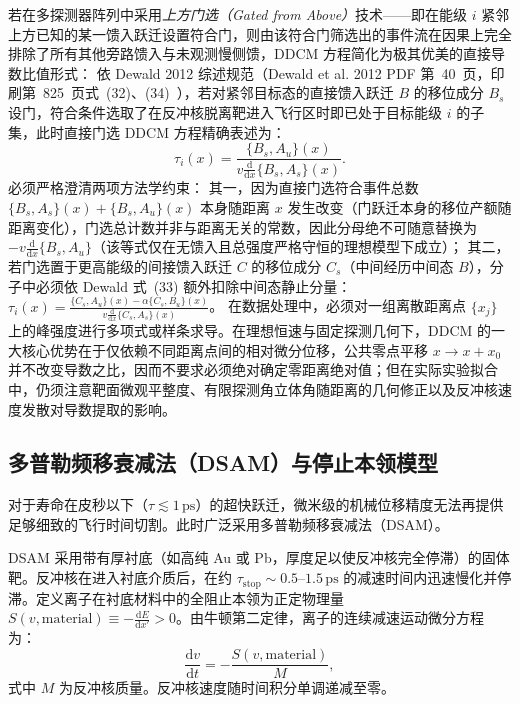 若在多探测器阵列中采用\emph{上方门选（Gated from Above）}技术——即在能级 $i$ 紧邻上方已知的某一馈入跃迁设置符合门，则由该符合门筛选出的事件流在因果上完全排除了所有其他旁路馈入与未观测慢侧馈，DDCM 方程简化为极其优美的直接导数比值形式：
依 Dewald 2012 综述规范（Dewald et al. 2012 PDF 第~40~页，印刷第~825~页式~(32)、(34)~\cite{dewald-2012-ddcm-recoil-distance}），若对紧邻目标态的直接馈入跃迁 $B$ 的移位成分 $B_s$ 设门，符合条件选取了在反冲核脱离靶进入飞行区时即已处于目标能级 $i$ 的子集，此时直接门选 DDCM 方程精确表述为：
\begin{equation}\label{eq:5-8-ddcm-gated}
\tau_i(x) = \frac{\{B_s, A_u\}(x)}{v \frac{\mathrm{d}}{\mathrm{d}x} \{B_s, A_s\}(x)}.
\end{equation}
必须严格澄清两项方法学约束：
其一，因为直接门选符合事件总数 $\{B_s, A_s\}(x) + \{B_s, A_u\}(x)$ 本身随距离 $x$ 发生改变（门跃迁本身的移位产额随距离变化），门选总计数并非与距离无关的常数，因此分母绝不可随意替换为 $-v \frac{\mathrm{d}}{\mathrm{d}x} \{B_s, A_u\}$（该等式仅在无馈入且总强度严格守恒的理想模型下成立）；
其二，若门选置于更高能级的间接馈入跃迁 $C$ 的移位成分 $C_s$（中间经历中间态 $B$），分子中必须依 Dewald 式~(33) 额外扣除中间态静止分量：$\tau_i(x) = \frac{\{C_s, A_u\}(x) - \alpha \{C_s, B_u\}(x)}{v \frac{\mathrm{d}}{\mathrm{d}x} \{C_s, A_s\}(x)}$。
在数据处理中，必须对一组离散距离点 $\{x_j\}$ 上的峰强度进行多项式或样条求导。在理想恒速与固定探测几何下，DDCM 的一大核心优势在于仅依赖不同距离点间的相对微分位移，公共零点平移 $x \to x + x_0$ 并不改变导数之比，因而不要求必须绝对确定零距离绝对值；但在实际实验拟合中，仍须注意靶面微观平整度、有限探测角立体角随距离的几何修正以及反冲核速度发散对导数提取的影响。

\subsection{多普勒频移衰减法（DSAM）与停止本领模型}\label{subsec:5-8-3}

对于寿命在皮秒以下（$\tau \lesssim 1\,\text{ps}$）的超快跃迁，微米级的机械位移精度无法再提供足够细致的飞行时间切割。此时广泛采用多普勒频移衰减法（DSAM）。

DSAM 采用带有厚衬底（如高纯 Au 或 Pb，厚度足以使反冲核完全停滞）的固体靶。反冲核在进入衬底介质后，在约 $\tau_{\mathrm{stop}} \sim 0.5$–$1.5\,\text{ps}$ 的减速时间内迅速慢化并停滞。定义离子在衬底材料中的全阻止本领为正定物理量 $S(v, \text{material}) \equiv -\frac{\mathrm{d}E}{\mathrm{d}x'} > 0$。由牛顿第二定律，离子的连续减速运动微分方程为：
\begin{equation}\label{eq:5-8-velocity-history}
\frac{\mathrm{d}v}{\mathrm{d}t} = -\frac{S(v, \text{material})}{M},
\end{equation}
式中 $M$ 为反冲核质量。反冲核速度随时间积分单调递减至零。

